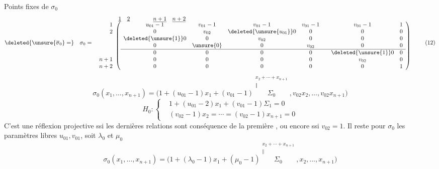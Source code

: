 \par
Points fixes de $\sigma_0$
\[
\deleted{\unsure{\overline{\sigma}_0}=}\quad\sigma_0=
\begin{array}{r@{}l}
&\begin{array}{ccccccc}\underline{1}&\underline{2}&&&&\underline{n+1}&\underline{n+2}\end{array}\\[-.5ex]
\begin{array}{r}1\\2\\\\\\\\n+1\\n+2\end{array}&
\left(\begin{array}{ccccccc}
u_{01}-1&v_{01}-1&v_{01}-1&v_{01}-1&&v_{01}-1&1\\
0&v_{02}&\deleted{\unsure{u_{01}}}0&0&&0&0\\
\deleted{\unsure{1}}0&0&v_{02}&0&&0&0\\
0&\unsure{0}&0&v_{02}&&0&0\\
\hline
0&0&0&0&&\deleted{\unsure{1}}0&0\\
0&0&0&0&&v_{02}&0\\
0&0&0&0&&0&1
\end{array}\right)
\end{array}\tag*{(12)}
\]
\[
\sigma_0(x_1,\ldots,x_{n+1})=\bigl(1+(u_{01}-1)x_1+(v_{01}-1)\overset{\substack{x_2+\cdots+x_{n+1}\\\Vert}}{\Sigma_0},v_{02}x_2,\ldots,v_{02}x_{n+1}\bigr)\tag*{(13)}
\]
\[
H_0:\left\{\begin{aligned}
&1+(u_{01}-2)x_1+(v_{01}-1)\Sigma_1=0\\
&(v_{02}-1)x_2=\cdots=(v_{02}-1)x_{n+1}=0
\end{aligned}\right.\tag*{(14)}
\]
C'est une réflexion projective ssi les dernières relations sont conséquence de la première , ou encore ssi $\boxed{v_{02}=1}$. Il reste pour $\sigma_0$ les paramètres libres $u_{01},v_{01}$, soit $\lambda_0$ et $\mu_0$
\[
\sigma_0(x_1,\ldots,x_{n+1})=\bigl(1+(\lambda_0-1)x_1+(\mu_0-1)\overset{\substack{x_2+\cdots+x_{n+1}\\\Vert}}{\Sigma_0},x_2,\ldots,x_{n+1}\bigr)\tag*{(15)}
\]
